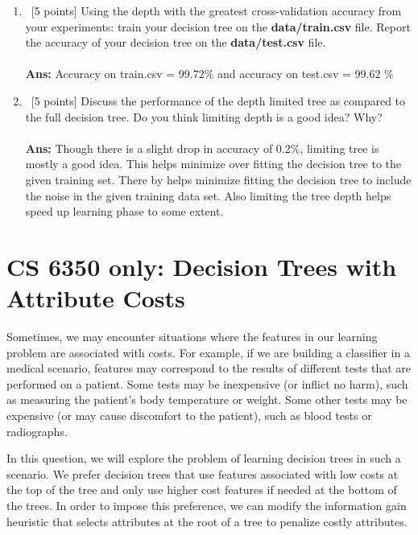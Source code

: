 \documentclass[12pt, fullpage,letterpaper]{article}
\begin{document}
\begin{enumerate}
\begin{enumerate}
            \item~[5 points] Using the depth with the greatest cross-validation accuracy from your experiments: train your decision tree on the \textbf{data/train.csv} file. Report the accuracy of your decision tree on the \textbf{data/test.csv} file.\\\\
\textbf{Ans: }Accuracy on train.csv = 99.72\% and accuracy on test.csv = 99.62 \%
            \item~[5 points] Discuss the performance of the depth limited tree as compared to the full decision tree. Do you think limiting depth is a good idea? Why?\\\\
          \textbf{Ans: }Though there is a slight drop in accuracy of 0.2\%, limiting tree is mostly a good idea. This helps minimize over fitting the decision tree to the given training set. There by helps minimize fitting the decision tree to include the noise in the given training data set. Also limiting the tree depth helps speed up learning phase to some extent. 
            
        \end{enumerate}

\end{enumerate}

\section{CS 6350 only: Decision Trees with Attribute Costs}
\label{q4}

\noindent[10 points] Sometimes, we may encounter situations where
the features in our learning problem are associated with costs. For
example, if we are building a classifier in a medical scenario,
features may correspond to the results of different tests that are
performed on a patient. Some tests may be inexpensive (or inflict no
harm), such as measuring the patient's body temperature or
weight. Some other tests may be expensive (or may cause discomfort
to the patient), such as blood tests or radiographs.

In this question, we will explore the problem of learning decision
trees in such a scenario. We prefer decision trees that use features
associated with low costs at the top of the tree and only use higher
cost features if needed at the bottom of the trees.  In order to
impose this preference, we can modify the information gain heuristic
that selects attributes at the root of a tree to penalize costly
attributes.
\end{document}
